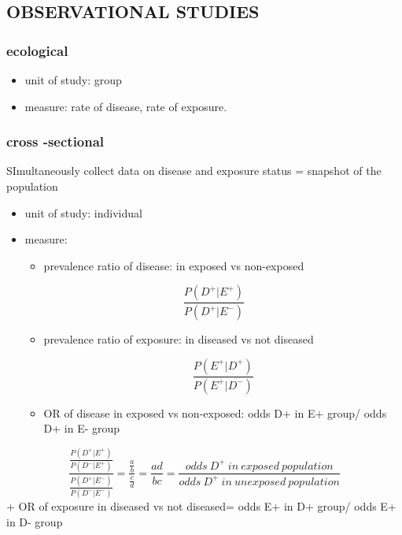 \documentclass[
]{article}
\providecommand{\tightlist}{%
  \setlength{\itemsep}{0pt}\setlength{\parskip}{0pt}}
\begin{document}
\hypertarget{observational-studies}{%
\subsection{OBSERVATIONAL STUDIES}\label{observational-studies}}

\hypertarget{ecological}{%
\subsubsection{ecological}\label{ecological}}

\begin{itemize}
\item
  unit of study: group
\item
  measure: rate of disease, rate of exposure.
\end{itemize}

\hypertarget{cross--sectional}{%
\subsubsection{cross -sectional}\label{cross--sectional}}

SImultaneously collect data on disease and exposure status = snapshot of
the population

\begin{itemize}
\item
  unit of study: individual
\item
  measure:

  \begin{itemize}
  \tightlist
  \item
    prevalence ratio of disease: in exposed vs non-exposed
  \end{itemize}

  \[\frac{P(D^+|E^+)}{P(D^+|E^-)}\]

  \begin{itemize}
  \item
    prevalence ratio of exposure: in diseased vs not diseased

    \[\frac{P(E^+|D^+)}{P(E^+|D^-)}\]
  \item
    OR of disease in exposed vs non-exposed: odds D+ in E+ group/ odds
    D+ in E- group
  \end{itemize}
\end{itemize}

\[\frac{\frac{P(D^+|E^+)}{P(D^-|E^+)}}{\frac{P(D^+|E^-)}{P(D^-|E^-)}}=\frac{\frac{a}{b}}{\frac{c}{d}}=\frac{ad}{bc}=\frac{odds\:D^+\:in\:exposed\:population}{odds\:D^+\:in\:unexposed\:population}\]
+ OR of exposure in diseased vs not diseased= odds E+ in D+ group/ odds
E+ in D- group
\end{document}

